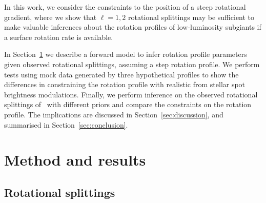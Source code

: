 In this work, we consider the constraints to the position of a steep rotational gradient, where we show that $\ell = 1,2$ rotational splittings may be sufficient to make valuable inferences about the rotation profiles of low-luminosity subgiants if a  surface rotation rate is available.

In Section~\ref{sec:methods_res} we describe a forward model to infer rotation profile parameters given observed rotational splittings, assuming a step rotation profile. 
We perform tests using mock data generated by three hypothetical profiles to show the differences in constraining the rotation profile with realistic from stellar spot brightness modulations. Finally, we perform inference on the observed rotational splittings of \thestar\ with different priors  and compare the constraints on the rotation profile. The implications are discussed in Section~\ref{sec:discussion}, and summarised in Section~\ref{sec:conclusion}.

\section{Method and results}
\label{sec:methods_res}
\subsection{Rotational splittings}


